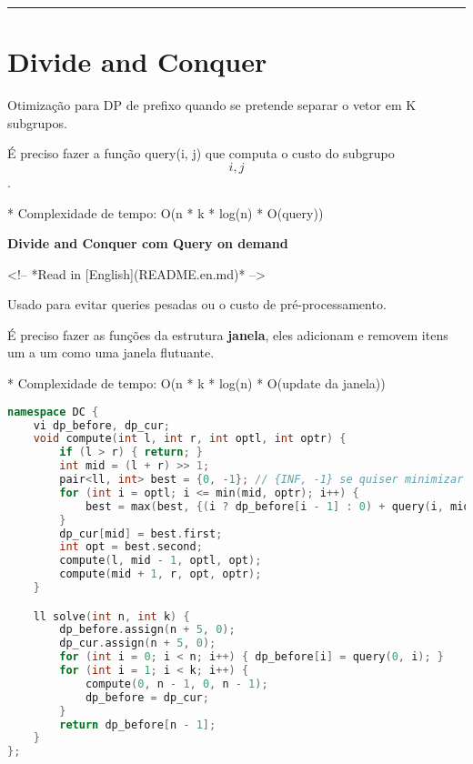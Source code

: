 \documentclass[11pt, a4paper, twoside]{book}
\begin{document}
\hfill

\rule{\textwidth}{0.4pt}

\section{Divide and Conquer}



Otimização para DP de prefixo quando se pretende separar o vetor em K subgrupos.    



É preciso fazer a função query(i, j) que computa o custo do subgrupo \[i, j\].

* Complexidade de tempo: O(n * k * log(n) *  O(query))



\textbf{Divide and Conquer com Query on demand} 



<!-- *Read in [English](README.en.md)* -->



Usado para evitar queries pesadas ou o custo de pré-processamento.  

É preciso fazer as funções da estrutura \textbf{janela}, eles adicionam e removem itens um a um como uma janela flutuante.



* Complexidade de tempo: O(n * k * log(n) * O(update da janela))






\hfill

\begin{lstlisting}[language=C++]
namespace DC {
    vi dp_before, dp_cur;
    void compute(int l, int r, int optl, int optr) {
        if (l > r) { return; }
        int mid = (l + r) >> 1;
        pair<ll, int> best = {0, -1}; // {INF, -1} se quiser minimizar
        for (int i = optl; i <= min(mid, optr); i++) {
            best = max(best, {(i ? dp_before[i - 1] : 0) + query(i, mid), i}); // min() se quiser minimizar
        }
        dp_cur[mid] = best.first;
        int opt = best.second;
        compute(l, mid - 1, optl, opt);
        compute(mid + 1, r, opt, optr);
    }

    ll solve(int n, int k) {
        dp_before.assign(n + 5, 0);
        dp_cur.assign(n + 5, 0);
        for (int i = 0; i < n; i++) { dp_before[i] = query(0, i); }
        for (int i = 1; i < k; i++) {
            compute(0, n - 1, 0, n - 1);
            dp_before = dp_cur;
        }
        return dp_before[n - 1];
    }
};
\end{lstlisting}
\end{document}
